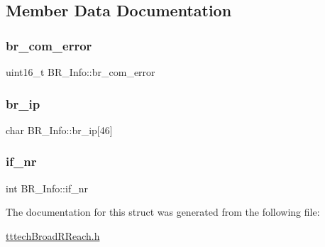 \subsection{Member Data Documentation}
\mbox{\label{struct_b_r___info_ac3670b53bfa902bb4295495b61fb6985}} 
\subsubsection{\texorpdfstring{br\+\_\+com\+\_\+error}{br\_com\_error}}
{\footnotesize\ttfamily uint16\+\_\+t B\+R\+\_\+\+Info\+::br\+\_\+com\+\_\+error}

\mbox{\label{struct_b_r___info_a8923532471f4ec953142656d0414765f}} 
\subsubsection{\texorpdfstring{br\+\_\+ip}{br\_ip}}
{\footnotesize\ttfamily char B\+R\+\_\+\+Info\+::br\+\_\+ip\mbox{[}46\mbox{]}}

\mbox{\label{struct_b_r___info_ad3139482d149e41ec15ac355cf4d5251}} 
\subsubsection{\texorpdfstring{if\+\_\+nr}{if\_nr}}
{\footnotesize\ttfamily int B\+R\+\_\+\+Info\+::if\+\_\+nr}



The documentation for this struct was generated from the following file\+:\begin{DoxyCompactItemize}
\item 
\mbox{\hyperlink{tttech_broad_r_reach_8h}{tttech\+Broad\+R\+Reach.\+h}}\end{DoxyCompactItemize}
